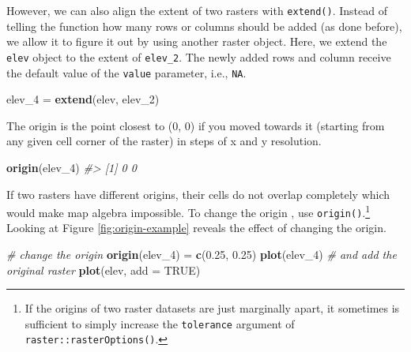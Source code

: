 \documentclass[]{krantz}
\newenvironment{Shaded}{\begin{snugshade}}{\end{snugshade}}
\newcommand{\CommentTok}[1]{\textcolor[rgb]{0.37,0.37,0.37}{\textit{#1}}}
\newcommand{\DataTypeTok}[1]{\textcolor[rgb]{0.27,0.27,0.27}{#1}}
\newcommand{\DecValTok}[1]{\textcolor[rgb]{0.06,0.06,0.06}{#1}}
\newcommand{\FloatTok}[1]{\textcolor[rgb]{0.06,0.06,0.06}{#1}}
\newcommand{\KeywordTok}[1]{\textcolor[rgb]{0.27,0.27,0.27}{\textbf{#1}}}
\newcommand{\NormalTok}[1]{#1}
\newcommand{\OtherTok}[1]{\textcolor[rgb]{0.37,0.37,0.37}{#1}}
\newcommand{\StringTok}[1]{\textcolor[rgb]{0.5,0.5,0.5}{#1}}
\let\rmarkdownfootnote\footnote%
\def\footnote{\protect\rmarkdownfootnote}
\begin{document}
However, we can also align the extent of two rasters with \texttt{extend()}.
Instead of telling the function how many rows or columns should be added (as done before), we allow it to figure it out by using another raster object.
Here, we extend the \texttt{elev} object to the extent of \texttt{elev\_2}.
The newly added rows and column receive the default value of the \texttt{value} parameter, i.e., \texttt{NA}.

\begin{Shaded}
\begin{Highlighting}[]
\NormalTok{elev_}\DecValTok{4}\NormalTok{ =}\StringTok{ }\KeywordTok{extend}\NormalTok{(elev, elev_}\DecValTok{2}\NormalTok{)}
\end{Highlighting}
\end{Shaded}

The origin is the point closest to (0, 0) if you moved towards it (starting from any given cell corner of the raster) in steps of x and y resolution.

\begin{Shaded}
\begin{Highlighting}[]
\KeywordTok{origin}\NormalTok{(elev_}\DecValTok{4}\NormalTok{)}
\CommentTok{#> [1] 0 0}
\end{Highlighting}
\end{Shaded}

If two rasters have different origins, their cells do not overlap completely which would make map algebra impossible.
To change the origin , use \texttt{origin()}.\footnote{If the origins of two raster datasets are just marginally apart, it sometimes is sufficient to simply increase the \texttt{tolerance} argument of \texttt{raster::rasterOptions()}.}
Looking at Figure \ref{fig:origin-example} reveals the effect of changing the origin.

\begin{Shaded}
\begin{Highlighting}[]
\CommentTok{# change the origin}
\KeywordTok{origin}\NormalTok{(elev_}\DecValTok{4}\NormalTok{) =}\StringTok{ }\KeywordTok{c}\NormalTok{(}\FloatTok{0.25}\NormalTok{, }\FloatTok{0.25}\NormalTok{)}
\KeywordTok{plot}\NormalTok{(elev_}\DecValTok{4}\NormalTok{)}
\CommentTok{# and add the original raster}
\KeywordTok{plot}\NormalTok{(elev, }\DataTypeTok{add =} \OtherTok{TRUE}\NormalTok{)}
\end{Highlighting}
\end{Shaded}
\end{document}
